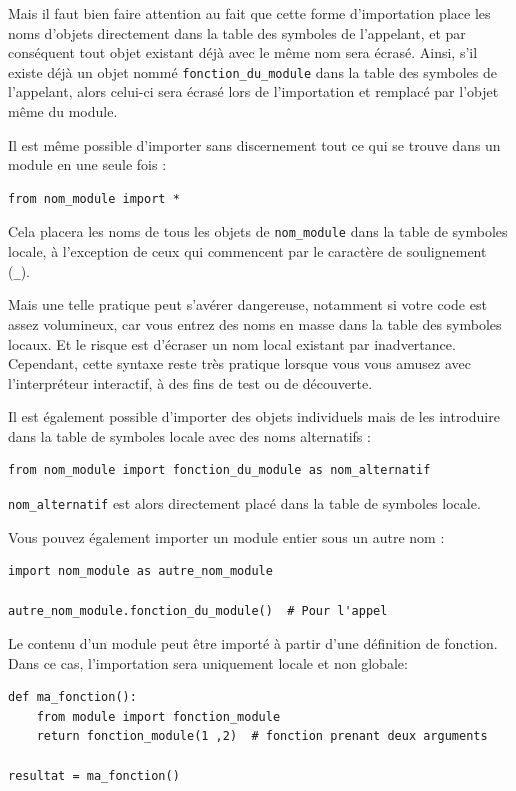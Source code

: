 \documentclass[a4paper,11pt]{book}
\begin{document}
Mais il faut bien faire attention au fait que cette forme d'importation place les noms d'objets directement dans la table des symboles de l'appelant, et par conséquent tout objet existant déjà avec le même nom sera écrasé. Ainsi, s'il existe déjà un objet nommé \texttt{fonction\_du\_module} dans la table des symboles de l'appelant, alors celui-ci sera écrasé lors de l'importation et remplacé par l'objet même du module.
\medskip

Il est même possible d'importer sans discernement tout ce qui se trouve dans un module en une seule fois :
\begin{lstlisting}[caption=Import de tous les objets du module]
from nom_module import *
\end{lstlisting}
\medskip

Cela placera les noms de tous les objets de \texttt{nom\_module} dans la table de symboles locale, à l'exception de ceux qui commencent par le caractère de soulignement (\texttt{\_}).
\medskip

Mais une telle pratique peut s'avérer dangereuse, notamment si votre code est assez volumineux, car vous entrez des noms en masse dans la table des symboles locaux. Et le risque est d'écraser un nom local existant par inadvertance. Cependant, cette syntaxe reste très pratique lorsque vous vous amusez avec l'interpréteur interactif, à des fins de test ou de découverte.
\medskip

Il est également possible d'importer des objets individuels mais de les introduire dans la table de symboles locale avec des noms alternatifs :
\begin{lstlisting}[caption=Import avec nom alternatif]
from nom_module import fonction_du_module as nom_alternatif
\end{lstlisting}
\medskip

\texttt{nom\_alternatif} est alors directement placé dans la table de symboles locale.
\medskip

Vous pouvez également importer un module entier sous un autre nom :
\begin{lstlisting}[caption=Import du module sous un autre nom]
import nom_module as autre_nom_module

autre_nom_module.fonction_du_module()  # Pour l'appel
\end{lstlisting}
\medskip

Le contenu d'un module peut être importé à partir d'une définition de fonction. Dans ce cas, l'importation sera uniquement locale et non globale:
\begin{lstlisting}[caption=Importation d'un module dans une fonction]
def ma_fonction():
    from module import fonction_module
    return fonction_module(1 ,2)  # fonction prenant deux arguments

resultat = ma_fonction()
\end{lstlisting}
\medskip
\end{document}
